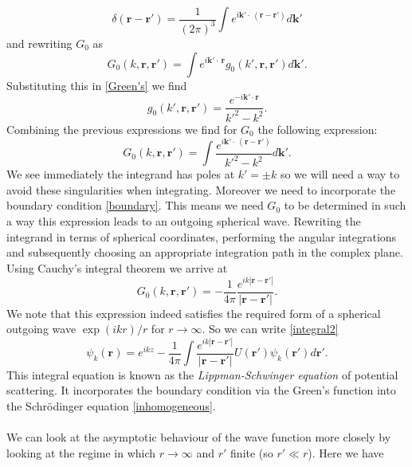 \documentclass[11pt]{article}
\numberwithin{equation}{section}
\begin{document}
\begin{equation}
\delta(\mathbf{r}-\mathbf{r}') = \frac{1}{(2\pi)^3} \int e^{i\mathbf{k}'\cdot ~(\mathbf{r}-\mathbf{r}')}d\mathbf{k}'
\end{equation}
and rewriting $G_0$ as
\begin{equation}
G_0(k,\mathbf{r},\mathbf{r}')	= \int e^{i\mathbf{k}'\cdot ~\mathbf{r}} g_0(k',\mathbf{r},\mathbf{r}') d\mathbf{k}'.
\end{equation} Substituting this in \eqref{Green's} we find
\begin{equation}
	g_0(k', \mathbf{r},\mathbf{r}') = \frac{e^{-i\mathbf{k}'\cdot \mathbf{r}}}{k'^2 - k^2}.
\end{equation}
Combining the previous expressions we find for $G_0$ the following expression:
\begin{equation}
G_0(k,\mathbf{r},\mathbf{r}')	= \int \frac{e^{i\mathbf{k}'\cdot ~(\mathbf{r}-\mathbf{r}')}}{k'^2 - k^2}  d\mathbf{k}'.
\end{equation}
We see immediately the integrand has poles at $k' = \pm k$ so we will need a way to avoid these singularities when integrating. Moreover we need to incorporate the boundary condition \eqref{boundary}. This means we need $G_0$ to be determined in such a way this expression leads to an outgoing spherical wave. Rewriting the integrand in terms of spherical coordinates, performing the angular integrations and subsequently choosing an appropriate integration path in the complex plane. Using Cauchy's integral theorem we arrive at
\begin{equation}
	G_0(k,\mathbf{r},\mathbf{r}')	= -\frac{1}{4\pi}\frac{e^{ik|\mathbf{r}-\mathbf{r}'|}}{|\mathbf{r}-\mathbf{r}'|}.
\end{equation}
We note that this expression indeed satisfies the required form of a spherical outgoing wave $\exp(ikr)/r$ for $r \rightarrow \infty$. So we can write \eqref{integral2}
\begin{equation}\label{Lippman-Schwinger}
	\psi_k(\mathbf{r}) = e^{ikz} -  \frac{1}{4\pi}\int	\frac{e^{ik|\mathbf{r}-\mathbf{r}'|}}{|\mathbf{r}-\mathbf{r}'|}  U(\mathbf{r}')\psi_k(\mathbf{r}')d\mathbf{r}'.
\end{equation}
This integral equation is known as the \emph{Lippman-Schwinger equation} of potential scattering. It incorporates the boundary condition via the Green's function into the Schr\"odinger equation \eqref{inhomogeneous}.\\
\\
We can look at the asymptotic behaviour of the wave function more closely by looking at the regime in which $r \rightarrow \infty$ and $r'$ finite (so $r' \ll r$). Here we have
\end{document}
